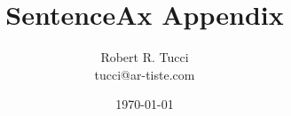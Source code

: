 \documentclass[12pt]{article}
\begin{document}
\title{SentenceAx Appendix}
\date{ \today}
\author{Robert R. Tucci\\
        tucci@ar-tiste.com}
\maketitle





\end{document}
